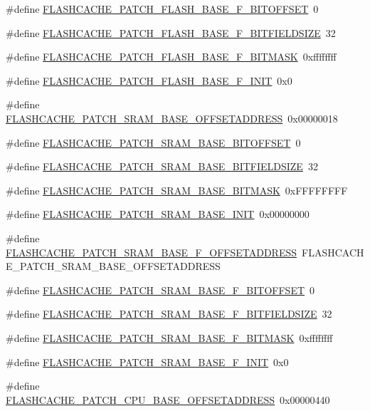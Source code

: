 \begin{DoxyCompactItemize}
\item 
\#define \hyperlink{a00550_ad6099bca475b1c76e7afabe41c02507a}{FLASHCACHE\_\-PATCH\_\-FLASH\_\-BASE\_\-F\_\-BITOFFSET}~0
\item 
\#define \hyperlink{a00550_a68b55e2f49b3c097f011a186dcfcfe72}{FLASHCACHE\_\-PATCH\_\-FLASH\_\-BASE\_\-F\_\-BITFIELDSIZE}~32
\item 
\#define \hyperlink{a00550_a6f6fe9edb85633e06615c7770005e8a7}{FLASHCACHE\_\-PATCH\_\-FLASH\_\-BASE\_\-F\_\-BITMASK}~0xffffffff
\item 
\#define \hyperlink{a00550_a6af9faeeb12f04cfd902243a95d98aa5}{FLASHCACHE\_\-PATCH\_\-FLASH\_\-BASE\_\-F\_\-INIT}~0x0
\item 
\#define \hyperlink{a00550_a9d7cb05d5bda54271a8b5fe5d7068919}{FLASHCACHE\_\-PATCH\_\-SRAM\_\-BASE\_\-OFFSETADDRESS}~0x00000018
\item 
\#define \hyperlink{a00550_ac3654b28549db1747a17b72fa6179fec}{FLASHCACHE\_\-PATCH\_\-SRAM\_\-BASE\_\-BITOFFSET}~0
\item 
\#define \hyperlink{a00550_aed22a7bd85ed75f7e8b2382590bdef89}{FLASHCACHE\_\-PATCH\_\-SRAM\_\-BASE\_\-BITFIELDSIZE}~32
\item 
\#define \hyperlink{a00550_a064aa77e03df1262d82b7ae00b410677}{FLASHCACHE\_\-PATCH\_\-SRAM\_\-BASE\_\-BITMASK}~0xFFFFFFFF
\item 
\#define \hyperlink{a00550_a29f1c1a93efe947c8aca316a4b672685}{FLASHCACHE\_\-PATCH\_\-SRAM\_\-BASE\_\-INIT}~0x00000000
\item 
\#define \hyperlink{a00550_ac379639692c6e48faf500db47ba1f774}{FLASHCACHE\_\-PATCH\_\-SRAM\_\-BASE\_\-F\_\-OFFSETADDRESS}~FLASHCACHE\_\-PATCH\_\-SRAM\_\-BASE\_\-OFFSETADDRESS
\item 
\#define \hyperlink{a00550_a90aa31b695598a2bc4cc186a75142a91}{FLASHCACHE\_\-PATCH\_\-SRAM\_\-BASE\_\-F\_\-BITOFFSET}~0
\item 
\#define \hyperlink{a00550_a98f0a1cea9b3f6d48557c2dffad48d65}{FLASHCACHE\_\-PATCH\_\-SRAM\_\-BASE\_\-F\_\-BITFIELDSIZE}~32
\item 
\#define \hyperlink{a00550_a69a478afdd8c44eb5b4b0f1ab472a0cc}{FLASHCACHE\_\-PATCH\_\-SRAM\_\-BASE\_\-F\_\-BITMASK}~0xffffffff
\item 
\#define \hyperlink{a00550_a08187d0fcc56c06065a3fa3e76fcaec8}{FLASHCACHE\_\-PATCH\_\-SRAM\_\-BASE\_\-F\_\-INIT}~0x0
\item 
\#define \hyperlink{a00550_a97e19984d8c68ce0ac64990d34e1edaa}{FLASHCACHE\_\-PATCH\_\-CPU\_\-BASE\_\-OFFSETADDRESS}~0x00000440
\item 

\end{DoxyCompactItemize}

